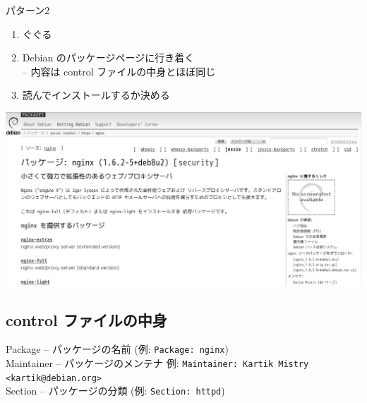 \documentclass[mingoth,a4paper]{jsarticle}
\begin{document}
   パターン2
   \begin{enumerate}
    \item ぐぐる
    \item Debian のパッケージページに行き着く\\
	  -- 内容は control ファイルの中身とほぼ同じ
    \item 読んでインストールするか決める
   \end{enumerate}

   \begin{center}
  \includegraphics[width=0.9\hsize]{image201606/pdo_mono.png}
   \end{center}


\subsection{control ファイルの中身}
  Package -- パッケージの名前 (例: \verb+Package: nginx+)
\\
  Maintainer -- パッケージのメンテナ
  例: \verb+Maintainer: Kartik Mistry <kartik@debian.org>+
\\
  Section -- パッケージの分類 (例: \verb+Section: httpd+)
\end{document}
